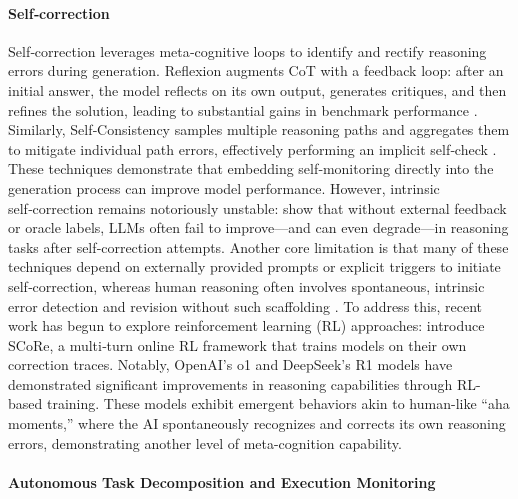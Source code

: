 \paragraph{Self‑correction} 
Self‑correction leverages meta‑cognitive loops to identify and rectify reasoning errors during generation. Reflexion augments CoT \citep{wei2022chain} with a feedback loop: after an initial answer, the model reflects on its own output, generates critiques, and then refines the solution, leading to substantial gains in benchmark performance \citep{shinn2023reflexion}. Similarly, Self‑Consistency samples multiple reasoning paths and aggregates them to mitigate individual path errors, effectively performing an implicit self‑check \citep{wangself}. These techniques demonstrate that embedding self‑monitoring directly into the generation process can improve model performance.
However, intrinsic self‑correction remains notoriously unstable: \citet{huanglarge} show that without external feedback or oracle labels, LLMs often fail to improve—and can even degrade—in reasoning tasks after self‑correction attempts. 
Another core limitation is that many of these techniques depend on externally provided prompts or explicit triggers to initiate self‑correction, whereas human reasoning often involves spontaneous, intrinsic error detection and revision without such scaffolding \citep{dunlosky2008metacognition, koriat2006metacognition}.
To address this, recent work has begun to explore reinforcement learning (RL) \cite{schulman2017proximal} approaches: \citet{kumar2024training} introduce SCoRe, a multi‑turn online RL framework that trains models on their own correction traces. Notably, OpenAI's o1 \cite{jaech2024openai} and DeepSeek's R1 \cite{guo2025deepseek} models have demonstrated significant improvements in reasoning capabilities through RL-based training. These models exhibit emergent behaviors akin to human-like ``aha moments,'' where the AI spontaneously recognizes and corrects its own reasoning errors, demonstrating another level of meta-cognition capability.



\paragraph{Autonomous Task Decomposition and Execution Monitoring}

